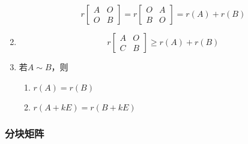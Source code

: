 \documentclass[a4paper,12pt]{article}
\begin{document}
\begin{enumerate}
        \[
            r\!\begin{bmatrix}
                   A & O \\
                   O & B
            \end{bmatrix}
            = r\!\begin{bmatrix}
                     O & A \\
                     B & O
            \end{bmatrix}
            = r(A) + r(B)
        \]
        \item
        \[
            r\!\begin{bmatrix}
                   A & O \\
                   C & B
            \end{bmatrix}
            \ge r(A) + r(B)
        \]
        \item 若$A \sim B$，则
        \begin{enumerate}
            \item $r(A) = r(B)$
            \item $r(A + kE) = r(B + kE)$
        \end{enumerate}
    \end{enumerate}

    \subsubsection{分块矩阵}
\end{document}
